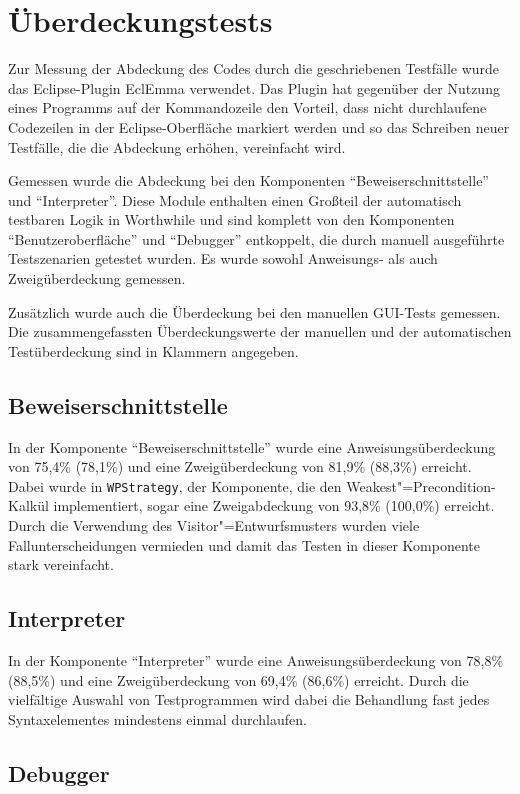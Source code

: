 \section{Überdeckungstests}
Zur Messung der Abdeckung des Codes durch die geschriebenen Testfälle wurde das Eclipse-Plugin EclEmma verwendet. Das Plugin hat gegenüber der Nutzung eines Programms auf der Kommandozeile den Vorteil, dass nicht durchlaufene Codezeilen in der Eclipse-Oberfläche markiert werden und so das Schreiben neuer Testfälle, die die Abdeckung erhöhen, vereinfacht wird.

Gemessen wurde die Abdeckung bei den Komponenten "`Beweiserschnittstelle"' und "`Interpreter"'. Diese Module enthalten einen Großteil der automatisch testbaren Logik in Worthwhile und sind komplett von den Komponenten "`Benutzeroberfläche"' und "`Debugger"' entkoppelt, die durch manuell ausgeführte Testszenarien getestet wurden. Es wurde sowohl Anweisungs- als auch Zweigüberdeckung gemessen.

Zusätzlich wurde auch die Überdeckung bei den manuellen GUI-Tests gemessen. Die zusammengefassten Überdeckungswerte der manuellen und der automatischen Testüberdeckung sind in Klammern angegeben.

\subsection{Beweiserschnittstelle}
In der Komponente "`Beweiserschnittstelle"' wurde eine Anweisungsüberdeckung von 75,4\% (78,1\%) und eine Zweigüberdeckung von 81,9\% (88,3\%) erreicht. Dabei wurde in \texttt{WPStrategy}, der Komponente, die den Weakest"=Precondition-Kalkül implementiert, sogar eine Zweigabdeckung von 93,8\% (100,0\%) erreicht. Durch die Verwendung des Visitor"=Entwurfsmusters wurden viele Fallunterscheidungen vermieden und damit das Testen in dieser Komponente stark vereinfacht.

\subsection{Interpreter}
In der Komponente "`Interpreter"' wurde eine Anweisungsüberdeckung von 78,8\% (88,5\%) und eine Zweigüberdeckung von 69,4\% (86,6\%) erreicht. Durch die vielfältige Auswahl von Testprogrammen wird dabei die Behandlung fast jedes Syntaxelementes mindestens einmal durchlaufen.

\subsection{Debugger}

